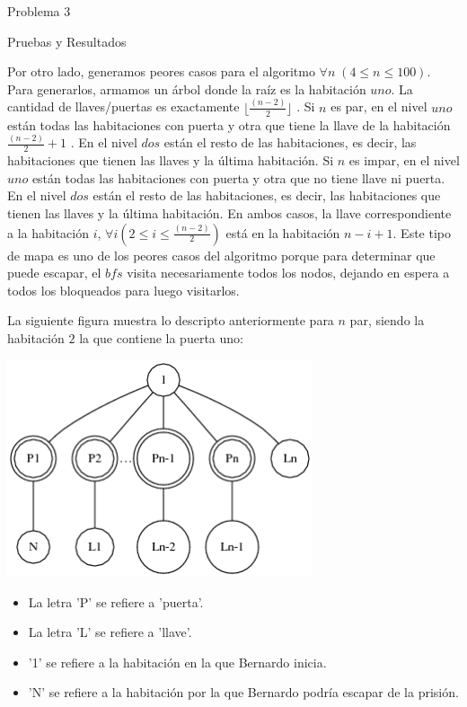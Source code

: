 \begin{section}{Problema 3}
\begin{subsection}{Pruebas y Resultados}
		\newpage

		Por otro lado, generamos peores casos para el algoritmo $\forall n\; (4 \leq n \leq 100)$. Para generarlos, armamos un árbol donde la raíz es la habitación  $uno$. La cantidad de llaves/puertas es exactamente $\lfloor \frac{(n-2)}{2}\rfloor$ . Si $n$ es par, en el nivel $uno$  están todas las habitaciones con puerta y otra que tiene la llave de la habitación $\frac{(n-2)}{2} + 1$ . En el nivel $dos$ están el resto de las habitaciones, es decir, las habitaciones que tienen las llaves y la última habitación. Si $n$ es impar, en el nivel $uno$  están todas las habitaciones con puerta y otra que no tiene llave ni puerta. En el nivel $dos$ están el resto de las habitaciones, es decir, las habitaciones que tienen las llaves y la última habitación. En ambos casos, la llave correspondiente a la habitación $i$, $\forall i (2 \leq i \leq \frac{(n-2)}{2})$ está en la habitación $n-i+1$. Este tipo de mapa es uno de los peores casos del algoritmo porque para determinar que puede escapar, el $bfs$ visita necesariamente todos los nodos, dejando en espera a todos los bloqueados para luego visitarlos.

		La siguiente figura muestra lo descripto anteriormente para $n$ par, siendo la habitación $2$ la que contiene la puerta uno:
	
		\begin{center}\includegraphics[width=9cm]{prision/peor_caso.png}\end{center}

		\begin{itemize}
		\item La letra 'P' se refiere a 'puerta'.
		\item La letra 'L' se refiere a 'llave'.
		\item '1' se refiere a la habitación en la que Bernardo inicia.
		\item 'N' se refiere a la habitación por la que Bernardo podría escapar de la prisión.
		\end{itemize}


\end{subsection}
\end{section}
